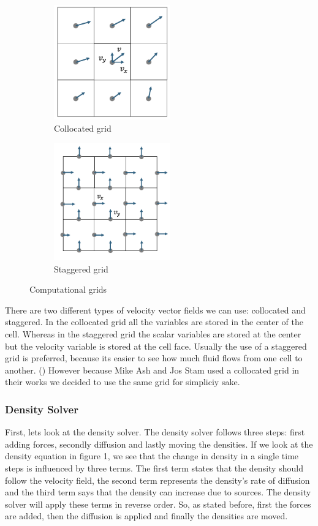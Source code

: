\documentclass[a4paper,12pt]{article}
\begin{document}
\begin{figure}[H]
\centering
\begin{subfigure}{.5\textwidth}
	\centering
	\includegraphics[width=5cm]{resources/collocated_grid_2.png}
	\caption{Collocated grid}
\end{subfigure}%
\begin{subfigure}{.5\textwidth}
	\centering
	\includegraphics[width=5cm]{resources/staggered_grid_2.png}
	\caption{Staggered grid}
\end{subfigure}
\caption{Computational grids}
\end{figure}

There are two different types of velocity vector fields we can use: collocated and staggered.
In the collocated grid all the variables are stored in the center of the cell. 
Whereas in the staggered grid the scalar variables are stored at the center but the velocity variable is stored at the cell face. 
Usually the use of a staggered grid is preferred, because its easier to see how much fluid flows from one cell to another. (\cite{tenminute})
However because Mike Ash and Jos Stam used a collocated grid in their works we decided to use the same grid for simpliciy sake. \\

\subsubsection{Density Solver} \label{density}

First, lets look at the density solver. The density solver follows three steps: first adding forces, secondly diffusion and lastly moving the densities. 
If we look at the density equation in figure 1, we see that the change in density in a single time steps is influenced by three terms. 
The first term states that the density should follow the velocity field,
the second term represents the density's rate of diffusion
and the third term says that the density can increase due to sources. 
The density solver will apply these terms in reverse order. 
So, as stated before, first the forces are added, then the diffusion is applied and finally the densities are moved. \\
\end{document}
